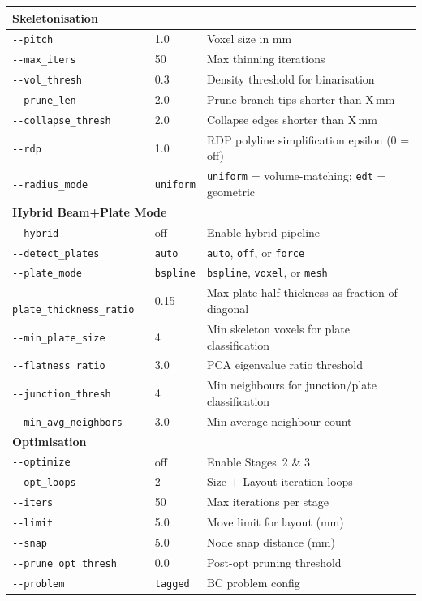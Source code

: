 \documentclass[a4paper, 11pt, openany]{report}
\begin{document}
\begin{longtable}{p{4cm}lp{6cm}}
\multicolumn{3}{l}{\textbf{Skeletonisation}} \\
\midrule
\texttt{-{}-pitch}        & 1.0  & Voxel size in mm \\
\texttt{-{}-max\_iters}   & 50   & Max thinning iterations \\
\texttt{-{}-vol\_thresh}  & 0.3  & Density threshold for binarisation \\
\texttt{-{}-prune\_len}   & 2.0  & Prune branch tips shorter than X\,mm \\
\texttt{-{}-collapse\_thresh} & 2.0 & Collapse edges shorter than X\,mm \\
\texttt{-{}-rdp}          & 1.0  & RDP polyline simplification epsilon (0 = off) \\
\texttt{-{}-radius\_mode} & \texttt{uniform} & \texttt{uniform} = volume-matching; \texttt{edt} = geometric \\
\midrule

\multicolumn{3}{l}{\textbf{Hybrid Beam+Plate Mode}} \\
\midrule
\texttt{-{}-hybrid}       & off   & Enable hybrid pipeline \\
\texttt{-{}-detect\_plates}& \texttt{auto} & \texttt{auto}, \texttt{off}, or \texttt{force} \\
\texttt{-{}-plate\_mode}  & \texttt{bspline} & \texttt{bspline}, \texttt{voxel}, or \texttt{mesh} \\
\texttt{-{}-plate\_thickness\_ratio} & 0.15 & Max plate half-thickness as fraction of diagonal \\
\texttt{-{}-min\_plate\_size} & 4 & Min skeleton voxels for plate classification \\
\texttt{-{}-flatness\_ratio} & 3.0 & PCA eigenvalue ratio threshold \\
\texttt{-{}-junction\_thresh} & 4 & Min neighbours for junction/plate classification \\
\texttt{-{}-min\_avg\_neighbors} & 3.0 & Min average neighbour count \\
\midrule

\multicolumn{3}{l}{\textbf{Optimisation}} \\
\midrule
\texttt{-{}-optimize}     & off   & Enable Stages~2 \& 3 \\
\texttt{-{}-opt\_loops}   & 2     & Size + Layout iteration loops \\
\texttt{-{}-iters}        & 50    & Max iterations per stage \\
\texttt{-{}-limit}        & 5.0   & Move limit for layout (mm) \\
\texttt{-{}-snap}         & 5.0   & Node snap distance (mm) \\
\texttt{-{}-prune\_opt\_thresh} & 0.0 & Post-opt pruning threshold \\
\texttt{-{}-problem}      & \texttt{tagged} & BC problem config \\
\midrule


\end{longtable}
\end{document}
